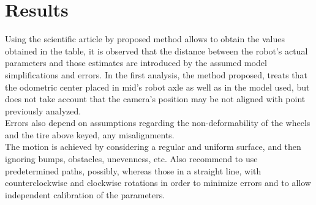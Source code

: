 \section{Results}
Using the scientific article by proposed method allows to obtain the values obtained in the table, it is observed that the distance between the robot’s actual parameters and those estimates are introduced by the assumed model simplifications and errors.
In the first analysis, the method proposed, treats that the odometric center placed in mid’s robot axle as well as in the model used, but does not take account that the camera’s position may be not aligned with point previously analyzed.\\
Errors also depend on assumptions regarding the non-deformability of the wheels and the tire above keyed, any misalignments.\\ 
The motion is achieved by considering a regular and uniform surface, and then ignoring bumps, obstacles, unevenness, etc. 
Also recommend to use predetermined paths, possibly, whereas those in a straight line, with counterclockwise and clockwise rotations in order to minimize errors and to allow independent calibration of the parameters.